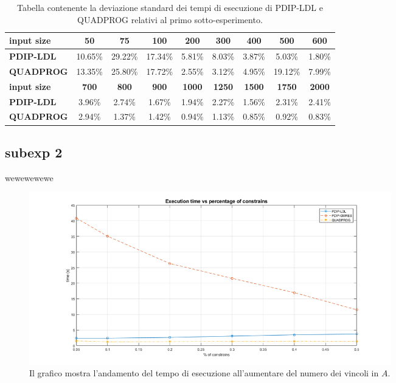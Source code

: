 \begin{table}[!h]
\centering
\begin{tabular}{|l|c|c|c|c|c|c|c|c|}\hline
\textbf{input size} & \textbf{50}  & \textbf{75}  & \textbf{100} & \textbf{200}  & \textbf{300}  & \textbf{400}  & \textbf{500}  & \textbf{600}  \\\hline
\textbf{PDIP-LDL}   & 10.65\%      & 29.22\%      & 17.34\%      & 5.81\%        & 8.03\%        & 3.87\%        & 5.03\%        & 1.80\%        \\
\textbf{QUADPROG}   & 13.35\%      & 25.80\%      & 17.72\%      & 2.55\%        & 3.12\%        & 4.95\%        & 19.12\%       & 7.99\%        \\\hline
\textbf{input size} & \textbf{700} & \textbf{800} & \textbf{900} & \textbf{1000} & \textbf{1250} & \textbf{1500} & \textbf{1750} & \textbf{2000} \\\hline
\textbf{PDIP-LDL}   & 3.96\%       & 2.74\%       & 1.67\%       & 1.94\%        & 2.27\%        & 1.56\%        & 2.31\%        & 2.41\%        \\
\textbf{QUADPROG}   & 2.94\%       & 1.37\%       & 1.42\%       & 0.94\%        & 1.13\%        & 0.85\%        & 0.92\%        & 0.83\%     \\  \hline
\end{tabular}
    \caption{Tabella contenente la deviazione standard dei tempi di esecuzione di PDIP-LDL e QUADPROG relativi al primo sotto-esperimento. \label{tab:ldlqp1.1}}
\end{table}


\subsection*{subexp 2}

wewewewewe

\begin{figure}[!h]
    \centering
    \includegraphics[width=\textwidth, height=7.5cm]{img/MU2.png}
    \caption{Il grafico mostra l'andamento del tempo di esecuzione all'aumentare del numero dei vincoli in $A$. \label{fig:exp1}}
\end{figure}
 
